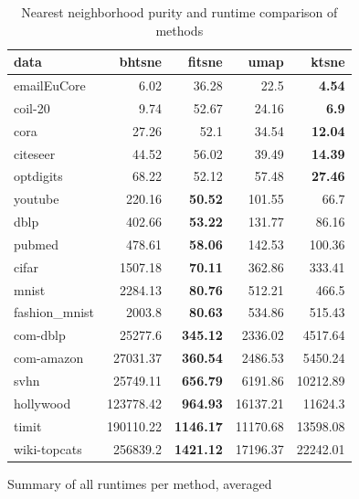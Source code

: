 \begin{table}[tb]
\begin{subtable}{\linewidth}
    \centering
  \begin{tabular}{lrrrr}
\toprule
data & bhtsne & fitsne & umap & ktsne \\ \midrule
emailEuCore & \num{6.02} & \num{36.28} & \num{22.5} & \bfseries \num{4.54} \\
coil-20 & \num{9.74} & \num{52.67} & \num{24.16} & \bfseries \num{6.9} \\
cora & \num{27.26} & \num{52.1} & \num{34.54} & \bfseries \num{12.04} \\
citeseer & \num{44.52} & \num{56.02} & \num{39.49} & \bfseries \num{14.39} \\
optdigits & \num{68.22} & \num{52.12} & \num{57.48} & \bfseries \num{27.46} \\
youtube & \num{220.16} & \bfseries \num{50.52} & \num{101.55} & \num{66.7} \\
dblp & \num{402.66} & \bfseries \num{53.22} & \num{131.77} & \num{86.16} \\
pubmed & \num{478.61} & \bfseries \num{58.06} & \num{142.53} & \num{100.36} \\
cifar & \num{1507.18} & \bfseries \num{70.11} & \num{362.86} & \num{333.41} \\
mnist & \num{2284.13} & \bfseries \num{80.76} & \num{512.21} & \num{466.5} \\
fashion\_mnist & \num{2003.8} & \bfseries \num{80.63} & \num{534.86} & \num{515.43} \\
com-dblp & \num{25277.6} & \bfseries \num{345.12} & \num{2336.02} & \num{4517.64} \\
com-amazon & \num{27031.37} & \bfseries \num{360.54} & \num{2486.53} & \num{5450.24} \\
svhn & \num{25749.11} & \bfseries \num{656.79} & \num{6191.86} & \num{10212.89} \\
hollywood & \num{123778.42} & \bfseries \num{964.93} & \num{16137.21} & \num{11624.3} \\
timit & \num{190110.22} & \bfseries \num{1146.17} & \num{11170.68} & \num{13598.08} \\
wiki-topcats & \num{256839.2} & \bfseries \num{1421.12} & \num{17196.37} & \num{22242.01} \\
\bottomrule
  \end{tabular}
  \caption{Summary of all runtimes per method, averaged}
\end{subtable}
\caption{Nearest neighborhood purity and runtime comparison of methods}
\label{tab:comp}
\end{table}

